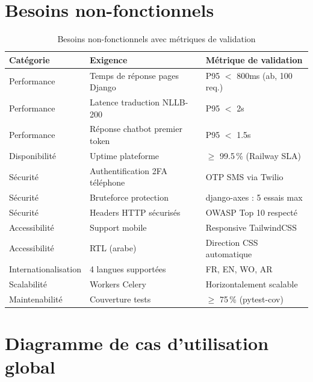 \documentclass[12pt,a4paper,twoside]{report}
\begin{document}
\section{Besoins non-fonctionnels}

\begin{table}[H]
\centering
\caption{Besoins non-fonctionnels avec métriques de validation}
\label{tab:bnf}
\begin{tabular}{L{2.5cm}L{6cm}L{5cm}}
\toprule
\textbf{Catégorie} & \textbf{Exigence} & \textbf{Métrique de validation} \\
\midrule
Performance    & Temps de réponse pages Django & P95 $<$ 800ms (ab, 100 req.) \\
Performance    & Latence traduction NLLB-200   & P95 $<$ 2s \\
Performance    & Réponse chatbot premier token & P95 $<$ 1.5s \\
Disponibilité  & Uptime plateforme             & $\geq$ 99.5\,\% (Railway SLA) \\
Sécurité       & Authentification 2FA téléphone& OTP SMS via Twilio \\
Sécurité       & Bruteforce protection         & django-axes : 5 essais max \\
Sécurité       & Headers HTTP sécurisés        & OWASP Top 10 respecté~\cite{owasp2021top10} \\
Accessibilité  & Support mobile                & Responsive TailwindCSS \\
Accessibilité  & RTL (arabe)                   & Direction CSS automatique \\
Internationalisation & 4 langues supportées  & FR, EN, WO, AR \\
Scalabilité    & Workers Celery                & Horizontalement scalable \\
Maintenabilité & Couverture tests              & $\geq$ 75\,\% (pytest-cov) \\
\bottomrule
\end{tabular}
\end{table}

\section{Diagramme de cas d'utilisation global}
\end{document}
